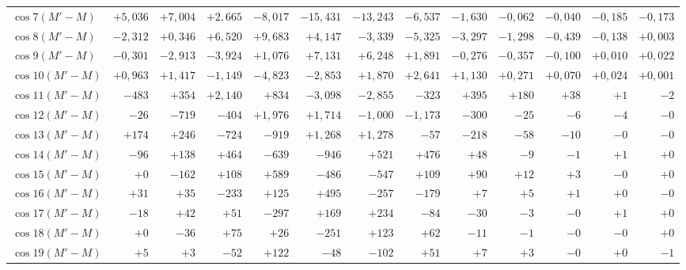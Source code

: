 \begin{landscape}
\begin{longtable}{@{}l|r|r|r|r|r|r|r|r|r|r|r|r@{}}
\(\cos 7(M'-M)\) & \(+5{,}036\) & \(+7{,}004\) & \(+2{,}665\) & \(-8{,}017\) & \(-15{,}431\) & \(-13{,}243\) & \(-6{,}537\) & \(-1{,}630\) & \(-0{,}062\) & \(-0{,}040\) & \(-0{,}185\) & \(-0{,}173\)\\
\(\cos 8(M'-M)\) & \(-2{,}312\) & \(+0{,}346\) & \(+6{,}520\) & \(+9{,}683\) & \(+4{,}147\) & \(-3{,}339\) & \(-5{,}325\) & \(-3{,}297\) & \(-1{,}298\) & \(-0{,}439\) & \(-0{,}138\) & \(+0{,}003\)\\
\(\cos 9(M'-M)\) & \(-0{,}301\) & \(-2{,}913\) & \(-3{,}924\) & \(+1{,}076\) & \(+7{,}131\) & \(+6{,}248\) & \(+1{,}891\) & \(-0{,}276\) & \(-0{,}357\) & \(-0{,}100\) & \(+0{,}010\) & \(+0{,}022\)\\
\(\cos 10(M'-M)\) & \(+0{,}963\) & \(+1{,}417\) & \(-1{,}149\) & \(-4{,}823\) & \(-2{,}853\) & \(+1{,}870\) & \(+2{,}641\) & \(+1{,}130\) & \(+0{,}271\) & \(+0{,}070\) & \(+0{,}024\) & \(+0{,}001\)\\
\(\cos 11(M'-M)\) & \(-483\) & \(+354\) & \(+2{,}140\) & \(+834\) & \(-3{,}098\) & \(-2{,}855\) & \(-323\) & \(+395\) & \(+180\) & \(+38\) & \(+1\) & \(-2\)\\
\(\cos 12(M'-M)\) & \(-26\) & \(-719\) & \(-404\) & \(+1{,}976\) & \(+1{,}714\) & \(-1{,}000\) & \(-1{,}173\) & \(-300\) & \(-25\) & \(-6\) & \(-4\) & \(-0\)\\
\(\cos 13(M'-M)\) & \(+174\) & \(+246\) & \(-724\) & \(-919\) & \(+1{,}268\) & \(+1{,}278\) & \(-57\) & \(-218\) & \(-58\) & \(-10\) & \(-0\) & \(-0\)\\
\(\cos 14(M'-M)\) & \(-96\) & \(+138\) & \(+464\) & \(-639\) & \(-946\) & \(+521\) & \(+476\) & \(+48\) & \(-9\) & \(-1\) & \(+1\) & \(+0\)\\
\(\cos 15(M'-M)\) & \(+0\) & \(-162\) & \(+108\) & \(+589\) & \(-486\) & \(-547\) & \(+109\) & \(+90\) & \(+12\) & \(+3\) & \(-0\) & \(+0\)\\
\(\cos 16(M'-M)\) & \(+31\) & \(+35\) & \(-233\) & \(+125\) & \(+495\) & \(-257\) & \(-179\) & \(+7\) & \(+5\) & \(+1\) & \(+0\) & \(-0\)\\
\(\cos 17(M'-M)\) & \(-18\) & \(+42\) & \(+51\) & \(-297\) & \(+169\) & \(+234\) & \(-84\) & \(-30\) & \(-3\) & \(-0\) & \(+1\) & \(+0\)\\
\(\cos 18(M'-M)\) & \(+0\) & \(-36\) & \(+75\) & \(+26\) & \(-251\) & \(+123\) & \(+62\) & \(-11\) & \(-1\) & \(-0\) & \(-0\) & \(+0\)\\
\(\cos 19(M'-M)\) & \(+5\) & \(+3\) & \(-52\) & \(+122\) & \(-48\) & \(-102\) & \(+51\) & \(+7\) & \(+3\) & \(-0\) & \(+0\) & \(-1\)\\

\end{longtable}
\end{landscape}
